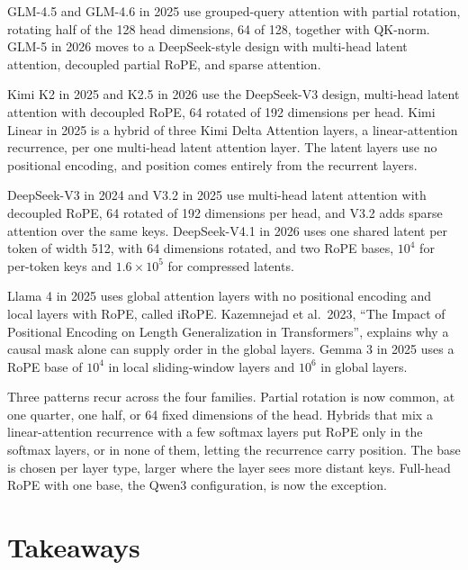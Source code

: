 GLM-4.5 and GLM-4.6 in 2025 use grouped-query attention with partial
rotation, rotating half of the 128 head dimensions, 64 of 128, together
with QK-norm. GLM-5 in 2026 moves to a DeepSeek-style design with
multi-head latent attention, decoupled partial RoPE, and sparse
attention.

Kimi K2 in 2025 and K2.5 in 2026 use the DeepSeek-V3 design, multi-head
latent attention with decoupled RoPE, 64 rotated of 192 dimensions per
head. Kimi Linear in 2025 is a hybrid of three Kimi Delta Attention
layers, a linear-attention recurrence, per one multi-head latent
attention layer. The latent layers use no positional encoding, and
position comes entirely from the recurrent layers.

DeepSeek-V3 in 2024 and V3.2 in 2025 use multi-head latent attention
with decoupled RoPE, 64 rotated of 192 dimensions per head, and V3.2
adds sparse attention over the same keys. DeepSeek-V4.1 in 2026 uses one
shared latent per token of width 512, with 64 dimensions rotated, and
two RoPE bases, \(10^4\) for per-token keys and \(1.6 \times 10^5\) for
compressed latents.

Llama 4 in 2025 uses global attention layers with no positional encoding
and local layers with RoPE, called iRoPE. Kazemnejad et al.~2023, ``The
Impact of Positional Encoding on Length Generalization in
Transformers'', explains why a causal mask alone can supply order in the
global layers. Gemma 3 in 2025 uses a RoPE base of \(10^4\) in local
sliding-window layers and \(10^6\) in global layers.

Three patterns recur across the four families. Partial rotation is now
common, at one quarter, one half, or 64 fixed dimensions of the head.
Hybrids that mix a linear-attention recurrence with a few softmax layers
put RoPE only in the softmax layers, or in none of them, letting the
recurrence carry position. The base is chosen per layer type, larger
where the layer sees more distant keys. Full-head RoPE with one base,
the Qwen3 configuration, is now the exception.

\hypertarget{takeaways}{%
\section{Takeaways}\label{takeaways}}

